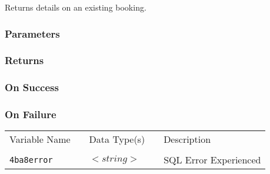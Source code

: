 Returns details on an existing booking.

\subsubsection{Parameters}

\subsubsection{Returns}

\subsubsection{On Success}

\subsubsection{On Failure}

\begin{tabular}{lllll}
Variable Name	&		&	Data Type(s)		&	&	Description	\\
				&	&	&	&	\\
\verb!4ba8error! & \hspace{15mm} & $<string>$ & \hspace{15mm} & SQL Error Experienced \\
\end{tabular}
